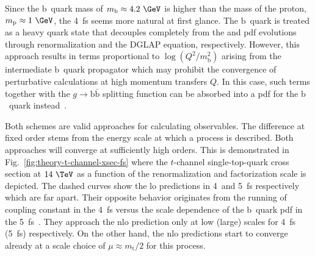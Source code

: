 Since the $\mathrm{b}$~quark mass of $m_\mathrm{b}\approx4.2~\GeV$ is higher than the mass of the proton, $m_\mathrm{p}\approx1~\GeV$, the 4~\gls{fs} seems more natural at first glance. The $\mathrm{b}$~quark is treated as a heavy quark state that decouples completely from the \as and \gls{pdf} evolutions through renormalization and the DGLAP equation, respectively. However, this approach results in terms proportional to $\log(Q^2/m_\mathrm{b}^2)$ arising from the intermediate $\mathrm{b}$~quark propagator which may prohibit the convergence of perturbative calculations at high momentum transfers $Q$. In this case, such terms together with the $g\to\mathrm{b}\bar{\mathrm{b}}$ splitting function can be absorbed into a \gls{pdf} for the $\mathrm{b}$~quark instead~\cite{Maltoni:2012pa}.

Both schemes are valid approaches for calculating observables. The difference at fixed order stems from the energy scale at which a process is described. Both approaches will converge at sufficiently high orders. This is demonstrated in Fig.~\ref{fig:theory-t-channel-xsec-fs} where the $t$-channel single-top-quark cross section at $14~\TeV$ as a function of the renormalization and factorization scale is depicted. The dashed curves show the \gls{lo} predictions in 4~and 5~\gls{fs} respectively which are far apart. Their opposite behavior originates from the running of coupling constant \as in the 4~\gls{fs} versus the scale dependence of the $\mathrm{b}$~quark \gls{pdf} in the 5~\gls{fs}~\cite{Maltoni:2012pa}. They approach the \gls{nlo} prediction only at low (large) scales for 4~\gls{fs} (5~\gls{fs}) respectively. On the other hand, the \gls{nlo} predictions start to converge already at a scale choice of $\mu\approx m_\mathrm{t}/2$ for this process.


